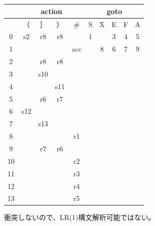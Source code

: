 \documentclass[a4paper,10pt]{jsarticle}
\begin{document}
\section{}
\begin{table}[H]
  \centering
  \begin{tabular}{|c||c|c|c|c|c|c|c|c|c|}
  \hline
     & \multicolumn{4}{c|}{action} & \multicolumn{5}{c|}{goto} \\ \hline
     & （     & ］     & ）    & \#   & S   & X   & E   & F  & A  \\ \hline\hline
  0  & s2    & r8    & r8   &      & 1   &     & 3   & 4  & 5  \\ \hline
  1  &       &       &      & acc  &     & 8   & 6   & 7  & 9  \\ \hline
  2  &       & r8    & r8   &      &     &     &     &    &    \\ \hline
  3  &       & s10   &      &      &     &     &     &    &    \\ \hline
  4  &       &       & s11  &      &     &     &     &    &    \\ \hline
  5  &       & r6    & r7   &      &     &     &     &    &    \\ \hline
  6  & s12   &       &      &      &     &     &     &    &    \\ \hline
  7  &       & s13   &      &      &     &     &     &    &    \\ \hline
  8  &       &       &      & r1   &     &     &     &    &    \\ \hline
  9  &       & r7    & r6   &      &     &     &     &    &    \\ \hline
  10 &       &       &      & r2   &     &     &     &    &    \\ \hline
  11 &       &       &      & r3   &     &     &     &    &    \\ \hline
  12 &       &       &      & r4   &     &     &     &    &    \\ \hline
  13 &       &       &      & r5   &     &     &     &    &    \\ \hline
  \end{tabular}
  \end{table}
衝突しないので、LR(1)構文解析可能ではない。
\end{document}
